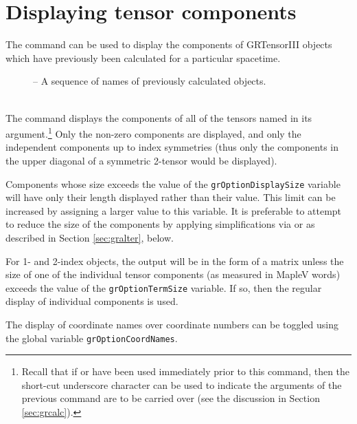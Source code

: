 \documentclass{article}
\begin{document}
\section{Displaying tensor components} \label{sec:grdisplay}
%
The command  can be used to display the components
of GRTensorIII objects which have previously been calculated for a
particular spacetime.\\
%
\begin{cmdspec}
  \label{spec:grdisplay}

  \begin{description}
    \item[] -- A sequence of names of previously calculated
      objects.
  \end{description}

\end{cmdspec}\\

The  command displays the components of all of the
tensors named in its argument.\footnote{Recall that if 
or  have been used immediately prior to this command,
then the short-cut underscore character can be used to indicate the
arguments of the previous command are to be carried over (see the
discussion in Section \ref{sec:grcalc}).}  Only the non-zero
components are displayed, and only the independent components up to
index symmetries (thus only the components in the upper diagonal of a
symmetric 2-tensor would be displayed).

Components whose size exceeds the value of the
\texttt{grOptionDisplaySize} variable will have only their length displayed
rather than their value. This limit can be increased by assigning a larger
value to this variable. It is preferable to attempt to reduce the size of
the components by applying simplifications via  or 
 as described in Section \ref{sec:gralter}, below.

For 1- and 2-index objects, the output will be in the form of a matrix
unless the size of one of the individual tensor components (as measured in
MapleV words) exceeds the value of the \texttt{grOptionTermSize} variable.
If so, then the regular display of individual components is used.

The display of coordinate names over coordinate numbers can be toggled
using the global variable \texttt{grOptionCoordNames}.\\
\end{document}
